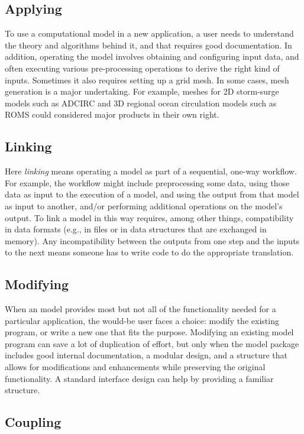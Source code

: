 \documentclass[12pt]{amsart}
\begin{document}
\subsection{Applying}

To use a computational model in a new application, a user needs to understand the theory and algorithms behind it, and that requires good documentation. In addition, operating the model involves obtaining and configuring input data, and often executing various pre-processing operations to derive the right kind of inputs. Sometimes it also requires setting up a grid mesh. In some cases, mesh generation is a major undertaking. For example, meshes for 2D storm-surge models such as ADCIRC and 3D regional ocean circulation models such as ROMS could considered major products in their own right.


\subsection{Linking}

Here \textit{linking} means operating a model as part of a sequential, one-way workflow. For example, the workflow might include preprocessing some data, using those data as input to the execution of a model, and using the output from that model as input to another, and/or performing additional operations on the model's output. To link a model in this way requires, among other things, compatibility in data formats (e.g., in files or in data structures that are exchanged in memory). Any incompatibility between the outputs from one step and the inputs to the next means someone has to write code to do the appropriate translation.

\subsection{Modifying}

When an model provides most but not all of the functionality needed for a particular application, the would-be user faces a choice: modify the existing program, or write a new one that fits the purpose. Modifying an existing model program can save a lot of duplication of effort, but only when the model package includes good internal documentation, a modular design, and a structure that allows for modifications and enhancements while preserving the original functionality. A standard interface design can help by providing a familiar structure.

\subsection{Coupling}
\end{document}
